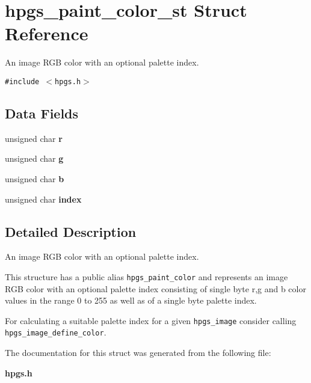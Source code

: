 \section{hpgs\_\-paint\_\-color\_\-st Struct Reference}
\label{structhpgs__paint__color__st}
An image RGB color with an optional palette index.  


{\tt \#include $<$hpgs.h$>$}

\subsection*{Data Fields}
\begin{CompactItemize}
\item 
unsigned char \textbf{r}\label{structhpgs__paint__color__st_12daa9c92a80e567247c59451d8fe4f1}

\item 
unsigned char \textbf{g}\label{structhpgs__paint__color__st_def6a2ae2a146ecea42cfad60c276a9b}

\item 
unsigned char \textbf{b}\label{structhpgs__paint__color__st_154b2f2f04b37f774bc731d837161a27}

\item 
unsigned char \textbf{index}\label{structhpgs__paint__color__st_7335459b625a2c15af167e518eac9fe4}

\end{CompactItemize}


\subsection{Detailed Description}
An image RGB color with an optional palette index. 

This structure has a public alias {\tt hpgs\_\-paint\_\-color} and represents an image RGB color with an optional palette index consisting of single byte r,g and b color values in the range 0 to 255 as well as of a single byte palette index.

For calculating a suitable palette index for a given {\tt hpgs\_\-image} consider calling {\tt hpgs\_\-image\_\-define\_\-color}. 

The documentation for this struct was generated from the following file:\begin{CompactItemize}
\item 
{\bf hpgs.h}\end{CompactItemize}

